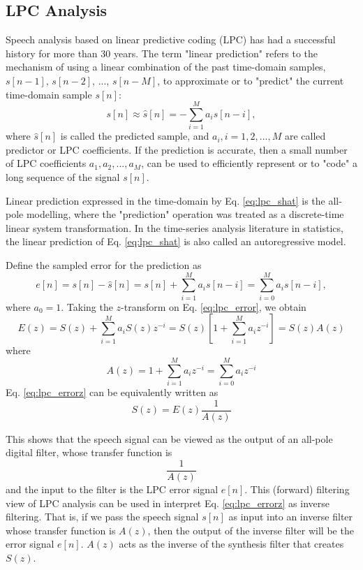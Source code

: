 \documentclass[12pt, a4paper, twoside]{report}
\begin{document}
\subsection{LPC Analysis}
Speech analysis based on linear predictive coding (LPC) has had a successful history for more than 30 years. The term "linear prediction" refers to the mechanism of using a linear combination of the past time-domain samples, $s[n-1]$, $s[n-2]$, ..., $s[n-M]$, to approximate or to "predict" the current time-domain sample $s[n]$:
\begin{equation} \label{eq:lpc_shat}
s[n]\approx \hat{s}[n] = -\sum_{i=1}^{M}a_i s[n-i],
\end{equation}
where $\hat{s}[n]$ is called the predicted sample, and $a_i, i = 1,2,...,M$ are called predictor or LPC coefficients. If the prediction is accurate, then a small number of LPC coefficients $a_1, a_2, ..., a_M$, can be used to efficiently represent or to "code" a long sequence of the signal $s[n]$. 

Linear prediction expressed in the time-domain by Eq. \ref{eq:lpc_shat} is the all-pole modelling, where the "prediction" operation was treated as a discrete-time linear system transformation. In the time-series analysis literature in statistics, the linear prediction of Eq. \ref{eq:lpc_shat} is also called an autoregressive model.

Define the sampled error for the prediction as
\begin{equation} \label{eq:lpc_error}
e[n] = s[n]-\hat{s}[n] = s[n] + \sum_{i=1}^{M}a_i s[n-i] = \sum_{i=0}^{M}a_i s[n-i],
\end{equation}
where $a_0 = 1$. Taking the $z$-transform on Eq. \ref{eq:lpc_error}, we obtain
\begin{equation} \label{eq:lpc_errorz}
E(z) = S(z) + \sum_{i=1}^{M} a_i S(z) z^{-i} = S(z)\left [ 1 + \sum_{i=1}^{M} a_i z^{-i} \right ] = S(z) A(z)
\end{equation}
where
\begin{equation*} \label{eq:lpc_az}
A(z) = 1 + \sum_{i=1}^{M} a_i z^{-i} = \sum_{i=0}^{M} a_i z^{-i}
\end{equation*}
Eq. \ref{eq:lpc_errorz} can be equivalently written as
\begin{equation*} \label{eq:lpc_sz}
S(z) = E(z) \frac{1}{A(z)}
\end{equation*}

This shows that the speech signal can be viewed as the output of an all-pole digital filter, whose transfer function is
\begin{equation*} \label{eq:lpc_filter_tf}
\frac{1}{A(z)}
\end{equation*}
and the input to the filter is the LPC error signal $e[n]$. This (forward) filtering view of LPC analysis can be used in interpret Eq. \ref{eq:lpc_errorz} as inverse filtering. That is, if we pass the speech signal $s[n]$ as input into an inverse filter whose transfer function is $A(z)$, then the output of the inverse filter will be the error signal $e[n]$. $A(z)$ acts as the inverse of the synthesis filter that creates $S(z)$.
\end{document}
